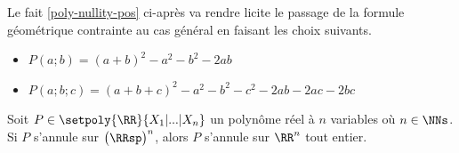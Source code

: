 Le fait \ref{poly-nullity-pos} ci-après va rendre licite le passage de la formule géométrique contrainte au cas général en faisant les choix suivants.
%
\begin{itemize}[label=\small\textbullet]
	\item $P(a ; b) = (a + b)^2 - a^2 - b^2 - 2 ab$

	\item $P(a ; b ; c) = (a + b + c)^2 - a^2 - b^2 - c^2 - 2 ab - 2 ac - 2 bc$
\end{itemize}




\begin{fact} \label{poly-nullity-pos}
	Soit $P \in \setpoly{\RR}{X_1 | ... | X_n}$ un polynôme réel à $n$ variables où $n \in \NNs$.
	Si $P$ s'annule sur $\big( \RRsp \big)^n$, alors $P$ s'annule sur $\RR^n$ tout entier. 
\end{fact}


